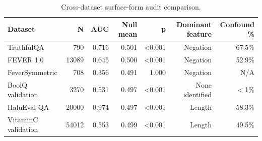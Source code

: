\begin{table}[t]
\centering
\caption{Cross-dataset surface-form audit comparison.}
\label{tab:cross_dataset}
\begin{tabular}{lrrrrrr}
\toprule
Dataset & N & AUC & Null mean & p & Dominant feature & Confound \% \\
\midrule
TruthfulQA & 790 & 0.716 & 0.501 & <0.001 & Negation & 67.5\% \\
FEVER 1.0 & 13089 & 0.645 & 0.500 & <0.001 & Negation & 52.9\% \\
FeverSymmetric & 708 & 0.356 & 0.491 & 1.000 & Negation & N/A \\
BoolQ validation & 3270 & 0.531 & 0.497 & <0.001 & None identified & $<$1\% \\
HaluEval QA & 20000 & 0.974 & 0.497 & <0.001 & Length & 58.3\% \\
VitaminC validation & 54012 & 0.553 & 0.499 & <0.001 & Length & 49.5\% \\
\bottomrule
\end{tabular}
\end{table}
